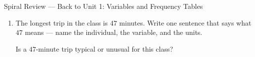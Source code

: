 \documentclass[12pt]{article}
\begin{document}
\begin{notesbox}{Spiral Review --- Back to Unit 1: Variables and Frequency Tables}
\begin{enumerate}[leftmargin=1.8em, itemsep=22pt, topsep=10pt]
        \vspace{8pt}
        How many students in all? \blank{1.6cm}\par\vspace{4pt}
        How many take $20$ minutes or more? \blank{1.6cm}

        \vspace{8pt}
        What \textbf{percent} of the class takes less than $10$ minutes?

        \begin{work}
           = 0.35 = 35\%
        \end{work}

  \item The longest trip in the class is $47$ minutes. Write one sentence that says what $47$
        means --- name the individual, the variable, and the units.
        \par\writeline

        \vspace{6pt}
        Is a $47$-minute trip typical or unusual for this class? \blank{2.4cm}

\end{enumerate}
\end{notesbox}
\end{document}
